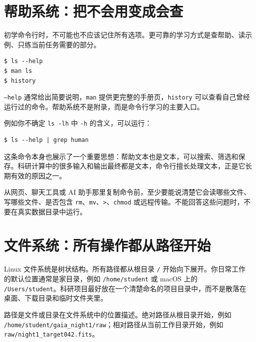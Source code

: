 \section{帮助系统：把不会用变成会查}

初学命令行时，不可能也不应该记住所有选项。更可靠的学习方式是查帮助、读示例、只练当前任务需要的部分。

\begin{examplebox}[查看帮助]
\begin{lstlisting}[style=terminal]
$ ls --help
$ man ls
$ history
\end{lstlisting}
\end{examplebox}

\texttt{--help} 通常给出简要说明，\texttt{man} 提供更完整的手册页，\texttt{history} 可以查看自己曾经运行过的命令。帮助系统不是附录，而是命令行学习的主要入口。

例如你不确定 \texttt{ls -lh} 中 \texttt{-h} 的含义，可以运行：

\begin{examplebox}[在帮助中搜索关键词]
\begin{lstlisting}[style=terminal]
$ ls --help | grep human
\end{lstlisting}
\end{examplebox}

这条命令本身也展示了一个重要思想：帮助文本也是文本，可以搜索、筛选和保存。科研计算中的很多输入和输出最终都是文本，命令行擅长处理文本，正是它长期有效的原因之一。

\begin{warnbox}[不要复制自己不理解的命令]
从网页、聊天工具或 AI 助手那里复制命令前，至少要能说清楚它会读哪些文件、写哪些文件、是否包含 \texttt{rm}、\texttt{mv}、\texttt{>}、\texttt{chmod} 或远程传输。不能回答这些问题时，不要在真实数据目录中运行。
\end{warnbox}

\section{文件系统：所有操作都从路径开始}

Linux 文件系统是树状结构。所有路径都从根目录 \texttt{/} 开始向下展开。你日常工作的默认位置通常是家目录，例如 \texttt{/home/student} 或 macOS 上的 \texttt{/Users/student}。科研项目最好放在一个清楚命名的项目目录中，而不是散落在桌面、下载目录和临时文件夹里。

\begin{defbox}[路径]
路径是文件或目录在文件系统中的位置描述。绝对路径从根目录开始，例如 \texttt{/home/student/gaia\_night1/raw}；相对路径从当前工作目录开始，例如 \texttt{raw/night1\_target042.fits}。
\end{defbox}

